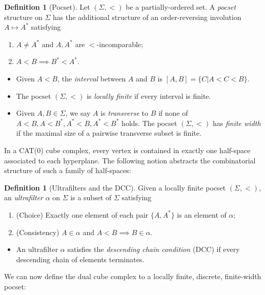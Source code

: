 \documentclass{amsart}
\theoremstyle{definition}
\newtheorem{definition}[theorem]{Definition}
\theoremstyle{remark}
\theoremstyle{definition}
\begin{document}
\begin{definition}[Pocset]\label{defn:pocset}
Let $(\Sigma,<)$ be a partially-ordered set.  A \emph{pocset} structure on $\Sigma$ has the additional structure of an order-reversing involution $A \mapsto A^*$ satisfying
\begin{enumerate}
\item $A \neq A^*$ and $A, A^*$ are $<$-incomparable;
\item $A < B \implies B^* < A^*$.
\end{enumerate}
\begin{itemize}
\item Given $A<B$, the \emph{interval} between $A$ and $B$ is $[A,B] = \{C|A<C<B\}$.
\item The pocset $(\Sigma,<)$ is \emph{locally finite} if every interval is finite.
\item Given $A,B \in \Sigma$, we say $A$ is \emph{transverse} to $B$ if none of $A<B, A<B^*, A^*<B, A^*<B^*$ holds.  The pocset $(\Sigma,<)$ has \emph{finite width} if the maximal size of a pairwise transverse subset is finite.

\end{itemize}
\end{definition}

In a CAT(0) cube complex, every vertex is contained in exactly one half-space associated to each hyperplane.  The following notion abstracts the combinatorial structure of such a family of half-spaces:

\begin{definition}[Ultrafilters and the DCC]\label{defn:ultrafilter}
Given a locally finite pocset $(\Sigma, <)$, an \emph{ultrafilter} $\alpha$ on $\Sigma$ is a subset of $\Sigma$ satisfying
\begin{enumerate}
\item (Choice) Exactly one element of each pair $\{A,A^*\}$ is an element of $\alpha$;
\item (Consistency) $A \in \alpha$ and $A< B \implies B \in \alpha$.
\end{enumerate}
\begin{itemize}
\item An ultrafilter $\alpha$ satisfies the \emph{descending chain condition} (DCC) if every descending chain of elements terminates.
\end{itemize}
\end{definition}

We can now define the dual cube complex to a locally finite, discrete, finite-width pocset:
\end{document}
